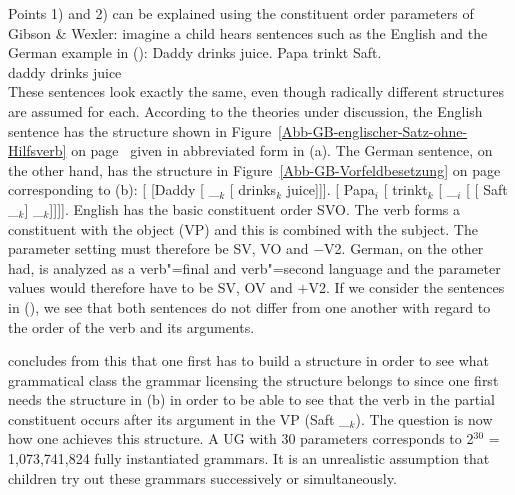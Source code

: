 Points 1) and 2) can be explained using the constituent order parameters of Gibson \& Wexler:
imagine a child hears sentences such as the English and the German example in ():
\eal
\ex Daddy drinks juice.
\ex 
\gll Papa trinkt Saft.\\
     daddy drinks juice\\
\zl
These sentences look exactly the same, even though radically different structures are assumed for each.
According to the theories under discussion, the English sentence has the structure shown in Figure~\ref{Abb-GB-englischer-Satz-ohne-Hilfsverb} on
page~\pageref{Abb-GB-englischer-Satz-ohne-Hilfsverb} given in abbreviated form in (a).
The German sentence, on the other hand, has the structure in Figure~\ref{Abb-GB-Vorfeldbesetzung} 
on page~\pageref{Abb-GB-Vorfeldbesetzung} corresponding to (b):
\eal
\ex {}[ [Daddy [ \_$_k$ [ drinks$_k$ juice]]].
\ex {}[ Papa$_i$ [ trinkt$_k$ [ \_$_i$ [ [ Saft \_$_k$] \_$_k$]]]].
\zl
English has the basic constituent order SVO. The verb forms a constituent with the object (VP) and this
is combined with the subject. The parameter setting must therefore be SV, VO and $-$V2. German,
on the other had, is analyzed as a verb"=final and verb"=second language and the parameter values
would therefore have to be SV, OV and $+$V2. If we consider the sentences in (), we see that
both sentences do not differ from one another with regard to the order of the verb and its arguments.

\citet{Fodor98a,Fodor98b} concludes from this that one first has to build a structure in order to see
what grammatical class the grammar licensing the structure belongs to since one first needs the structure
in (b) in order to be able to see
that the verb in the partial constituent occurs after its argument in the VP (Saft \_$_k$). The question is now how one achieves
this structure. A UG with 30 parameters corresponds to 2$^{30}$ = 1,073,741,824 fully instantiated grammars.
It is an unrealistic assumption that children try out these grammars successively or simultaneously.

